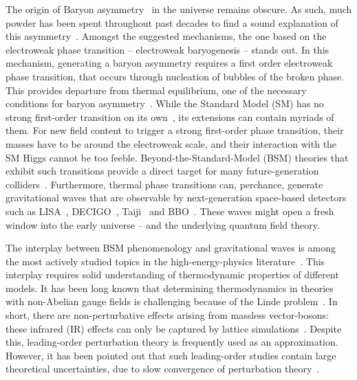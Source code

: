 \documentclass[11pt]{article}
\begin{document}
The origin of Baryon asymmetry~\cite{Canetti:2012zc} in the universe remains obscure.
As such,
much powder has been spent throughout past decades to find
a sound explanation of this asymmetry~\cite{%
  Elor:2022hpa,Shaposhnikov:1987tw,Shaposhnikov:1986jp,Kuzmin:1985mm}.
Amongst the suggested mechanisms,
the one based on the electroweak phase transition --
electroweak baryogenesis -- stands out.
In this mechanism, generating a baryon asymmetry requires
a first order electroweak phase transition, that occurs through nucleation of bubbles of the broken phase.
This provides departure from thermal equilibrium,
one of the necessary conditions for baryon asymmetry~\cite{Sakharov:1967dj}.
While the Standard Model (SM) has no strong first-order transition on its own~\cite{Kajantie:1995kf,Gurtler:1997hr,Kajantie:1996mn},
its extensions can contain myriads of them.
%
For new field content to trigger a strong first-order phase transition,
their masses have to be around the electroweak scale, and
their interaction with the SM Higgs cannot be too feeble.
Beyond-the-Standard-Model (BSM) theories
that exhibit such transitions provide a direct target for many
future-generation colliders~\cite{Ramsey-Musolf:2019lsf,Friedrich:2022cak}.
% 
Furthermore, thermal phase transitions can, perchance, generate
gravitational waves that are observable by next-generation space-based detectors such as
LISA~\cite{LISA:2017pwj},
DECIGO~\cite{Kawamura:2006up},
Taiji~\cite{Guo:2018npi} and
BBO~\cite{Harry:2006fi}.
These waves might open a fresh window into the early universe --
and
the underlying quantum field theory.

The interplay between BSM phenomenology and gravitational waves is among 
the most actively studied topics in
the high-energy-physics literature~\cite{%
  deVries:2017ncy,Dorsch:2018pat,Hall:2019ank,Baldes:2018nel,Chala:2018opy,Croon:2020cgk,Gould:2021dzl,Alves:2018jsw,Niemi:2021qvp,Bell:2020hnr,
  Niemi:2020hto}.
This interplay
requires solid understanding of thermodynamic properties of different models.
It has been long known that determining thermodynamics in theories with non-Abelian gauge fields is challenging because of
the Linde problem~\cite{Linde:1980ts}.
In short, there are non-perturbative effects arising from  massless vector-bosons: these infrared (IR) effects can only be captured by
lattice simulations~\cite{Braaten:1994na}.
Despite this, leading-order perturbation theory is frequently used as an approximation. 
However, it has been pointed out that such leading-order studies contain large theoretical uncertainties, due to slow convergence of
perturbation theory~\cite{Arnold:1992rz,Farakos:1994kx,Croon:2020cgk,Gould:2021oba}.
\end{document}

